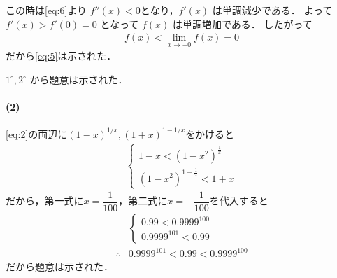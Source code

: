 \documentclass[../../main.tex]{subfiles}
\begin{document}

この時は\cref{eq:6}より $f''(x) < 0$となり，$f'(x)$ は単調減少である．
よって $f'(x) > f'(0) = 0$ となって $f(x)$ は単調増加である．
したがって
\begin{align}
  f(x) < \lim_{x \to -0} f(x) = 0
\end{align}
だから\cref{eq:5}は示された．
\casesend

$1^\circ, 2^\circ$ から題意は示された．

\paragraph{(2)}

\cref{eq:2}の両辺に$(1-x)^{1/x}, (1+x)^{1-1/x}$をかけると
\begin{align}
  \begin{cases}
    1-x < \left(1-x^2\right)^{\frac{1}{x}} \\
    (1-x^2)^{1-\frac{1}{x}} < 1 + x
  \end{cases}
\end{align}
だから，第一式に$x=\dfrac{1}{100}$，第二式に$x = -\dfrac{1}{100}$を代入すると
\begin{align}
  &
  \begin{cases}
    0.99 < 0.9999^{100} \\
    0.9999^{101} < 0.99
  \end{cases} \\
  \therefore
  & 0.9999^{101} < 0.99 < 0.9999^{100}
\end{align}
だから題意は示された．
\end{document}
